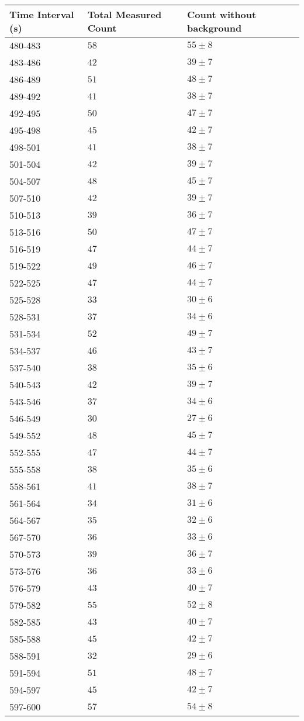 \begin{tabular}{| p{} | p{} | p{} |}\hline
Time Interval (s) & Total Measured Count & Count without background\\
\hline
480-483 & $58$ & $55\pm 8$\\
483-486 & $42$ & $39\pm 7$\\
486-489 & $51$ & $48\pm 7$\\
489-492 & $41$ & $38\pm 7$\\
492-495 & $50$ & $47\pm 7$\\
495-498 & $45$ & $42\pm 7$\\
498-501 & $41$ & $38\pm 7$\\
501-504 & $42$ & $39\pm 7$\\
504-507 & $48$ & $45\pm 7$\\
507-510 & $42$ & $39\pm 7$\\
510-513 & $39$ & $36\pm 7$\\
513-516 & $50$ & $47\pm 7$\\
516-519 & $47$ & $44\pm 7$\\
519-522 & $49$ & $46\pm 7$\\
522-525 & $47$ & $44\pm 7$\\
525-528 & $33$ & $30\pm 6$\\
528-531 & $37$ & $34\pm 6$\\
531-534 & $52$ & $49\pm 7$\\
534-537 & $46$ & $43\pm 7$\\
537-540 & $38$ & $35\pm 6$\\
540-543 & $42$ & $39\pm 7$\\
543-546 & $37$ & $34\pm 6$\\
546-549 & $30$ & $27\pm 6$\\
549-552 & $48$ & $45\pm 7$\\
552-555 & $47$ & $44\pm 7$\\
555-558 & $38$ & $35\pm 6$\\
558-561 & $41$ & $38\pm 7$\\
561-564 & $34$ & $31\pm 6$\\
564-567 & $35$ & $32\pm 6$\\
567-570 & $36$ & $33\pm 6$\\
570-573 & $39$ & $36\pm 7$\\
573-576 & $36$ & $33\pm 6$\\
576-579 & $43$ & $40\pm 7$\\
579-582 & $55$ & $52\pm 8$\\
582-585 & $43$ & $40\pm 7$\\
585-588 & $45$ & $42\pm 7$\\
588-591 & $32$ & $29\pm 6$\\
591-594 & $51$ & $48\pm 7$\\
594-597 & $45$ & $42\pm 7$\\
597-600 & $57$ & $54\pm 8$\\
\hline
\end{tabular}\quad
